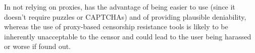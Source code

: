 In not relying on proxies, \hoot has the advantage of being easier to
use (since it doesn't require puzzles or CAPTCHAs) and of providing
plausible deniability, whereas the use of proxy-based censorship
resistance tools is likely to be inherently unacceptable to the censor
and could lead to the user being harassed or worse if found out.

\balance



%
